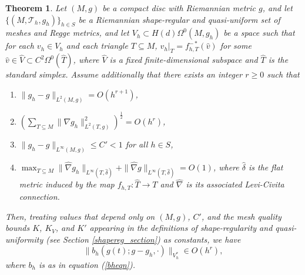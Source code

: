 \documentclass[11pt]{article}
\newtheorem{theorem}{Theorem}
\begin{document}
\begin{theorem}\label{Fhbounds}
Let $(M,g)$ be a compact disc with Riemannian metric $g$, and let $\{(M,\mathcal{T}_h,g_h)\}_{h \in S}$ be a Riemannian shape-regular and quasi-uniform set of meshes and Regge metrics, and let $V_h \subset H(d)\Omega^0(M,g_h)$ be a space such that for each $v_h \in V_h$ and each triangle $T \subseteq M$, $v_h|_T = f_{h,T}^{-*}(\hat v)$ for some $\hat v \in \hat V \subset C^2\Omega^0(\hat T)$, where $\hat V$ is a fixed finite-dimensional subspace and $\hat T$ is the standard simplex. Assume additionally that there exists an integer $r \ge 0$ such that
\begin{enumerate}\item{$\|g_h - g\|_{L^2(M,g)} = O(h^{r+1})$,}
\item{$\left(\sum_{T \subseteq M} \|\nabla g_h\|_{L^2(T,g)}^2\right)^\frac{1}{2} = O(h^r)$,}
\item{$\|g_h - g\|_{L^\infty(M,g)} \le C' < 1$ for all $h \in S$,}
\item{$\max_{T \subseteq M}\|\hat \nabla g_h\|_{L^\infty(T,\hat \delta)} + \|\hat \nabla g\|_{L^\infty(T,\hat \delta)} = O(1)$, where $\hat \delta$ is the flat metric induced by the map $f_{h,T}: \hat T \to T$ and $\hat{\nabla}$ is its associated Levi-Civita connection.} 
\end{enumerate}
Then, treating values that depend only on $(M,g)$, $C'$, and the mesh quality bounds $K$, $K_V$, and $K'$ appearing in the definitions of shape-regularity and quasi-uniformity (see Section \ref{shapereg_section}) as constants, we have
\[
\|b_h(g(t);g - g_h,\cdot)\|_{V_h^*} \in O(h^r),
\]
where $b_h$ is as in equation (\ref{bheqn}).
\end{theorem}
\end{document}
